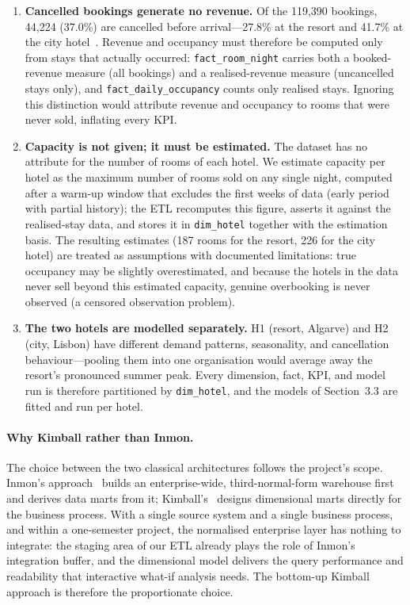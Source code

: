 \begin{enumerate}
  \item \textbf{Cancelled bookings generate no revenue.} Of the 119{,}390 bookings, 44{,}224 (37.0\%) are cancelled before arrival---27.8\% at the resort and 41.7\% at the city hotel~\cite{antonio2019}. Revenue and occupancy must therefore be computed only from stays that actually occurred: \texttt{fact\_room\_night} carries both a booked-revenue measure (all bookings) and a realised-revenue measure (uncancelled stays only), and \texttt{fact\_daily\_occupancy} counts only realised stays. Ignoring this distinction would attribute revenue and occupancy to rooms that were never sold, inflating every KPI.
  \item \textbf{Capacity is not given; it must be estimated.} The dataset has no attribute for the number of rooms of each hotel. We estimate capacity per hotel as the maximum number of rooms sold on any single night, computed after a warm-up window that excludes the first weeks of data (early period with partial history); the ETL recomputes this figure, asserts it against the realised-stay data, and stores it in \texttt{dim\_hotel} together with the estimation basis. The resulting estimates (187 rooms for the resort, 226 for the city hotel) are treated as assumptions with documented limitations: true occupancy may be slightly overestimated, and because the hotels in the data never sell beyond this estimated capacity, genuine overbooking is never observed (a censored observation problem).
  \item \textbf{The two hotels are modelled separately.} H1 (resort, Algarve) and H2 (city, Lisbon) have different demand patterns, seasonality, and cancellation behaviour---pooling them into one organisation would average away the resort's pronounced summer peak. Every dimension, fact, KPI, and model run is therefore partitioned by \texttt{dim\_hotel}, and the models of Section~3.3 are fitted and run per hotel.
\end{enumerate}

\paragraph{Why Kimball rather than Inmon.}
The choice between the two classical architectures follows the project's scope. Inmon's approach~\cite{inmon2005} builds an enterprise-wide, third-normal-form warehouse first and derives data marts from it; Kimball's~\cite{kimball2013} designs dimensional marts directly for the business process. With a single source system and a single business process, and within a one-semester project, the normalised enterprise layer has nothing to integrate: the staging area of our ETL already plays the role of Inmon's integration buffer, and the dimensional model delivers the query performance and readability that interactive what-if analysis needs. The bottom-up Kimball approach is therefore the proportionate choice.

